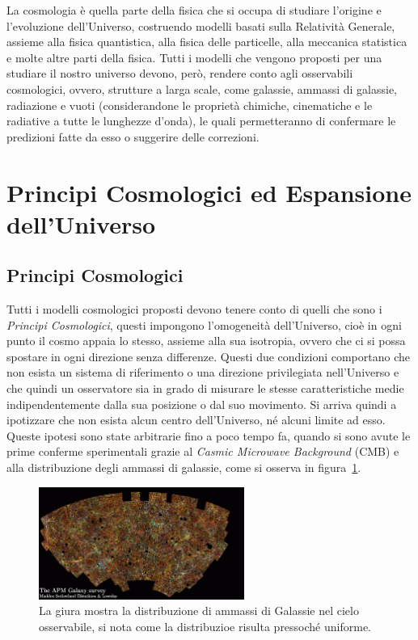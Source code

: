 La cosmologia è quella parte della fisica che si occupa di studiare l'origine e l'evoluzione dell'Universo, costruendo modelli basati sulla Relatività Generale, assieme alla fisica quantistica, alla fisica delle particelle, alla meccanica statistica e molte altre parti della fisica. Tutti i modelli che vengono proposti per una studiare il nostro universo devono, però, rendere conto agli osservabili cosmologici, ovvero, strutture a larga scale, come galassie, ammassi di galassie, radiazione e vuoti (considerandone le proprietà chimiche, cinematiche e le radiative a tutte le lunghezze d'onda), le quali permetteranno di confermare le predizioni fatte da esso o suggerire delle correzioni.
\section{Principi Cosmologici ed Espansione dell'Universo}\label{sec:principi-espansione}
\subsection{Principi Cosmologici}\label{sec:principi-cosmologici}

Tutti i modelli cosmologici proposti devono tenere conto di quelli che sono i \textit{Principi Cosmologici}, questi impongono l'omogeneità dell'Universo, cioè in ogni punto il cosmo appaia lo stesso, assieme alla sua isotropia, ovvero che ci si possa spostare in ogni direzione senza differenze. Questi due condizioni comportano che non esista un sistema di riferimento o una direzione privilegiata nell'Universo e che quindi un osservatore sia in grado di misurare le stesse caratteristiche medie indipendentemente dalla sua posizione o dal suo movimento. Si arriva quindi a ipotizzare che non esista alcun centro dell'Universo, né alcuni limite ad esso. Queste ipotesi sono state arbitrarie fino a poco tempo fa, quando si sono avute le prime conferme sperimentali grazie al \textit{Casmic Microwave Background} (CMB) e alla distribuzione degli ammassi di galassie, come si osserva in figura~\ref{fig:APM}.
\begin{figure}
    \centering
    \includegraphics[width=0.6\textwidth]{immagini/APM.png}
    \caption{La giura mostra la distribuzione di ammassi di Galassie nel cielo osservabile, si nota come la distribuzioe risulta pressoché uniforme.}\label{fig:APM}
\end{figure}
